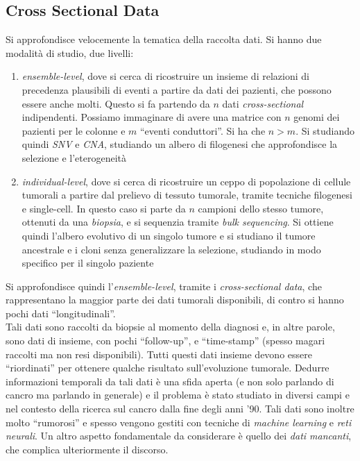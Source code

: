 \documentclass[a4paper,12pt, oneside]{book}
\begin{document}
\subsection{Cross Sectional Data}
Si approfondisce velocemente la tematica della raccolta dati. Si hanno due
modalità di studio, due livelli:
\begin{enumerate}
  \item \textit{ensemble-level}, dove si cerca di ricostruire un insieme di
  relazioni 
  di precedenza plausibili di eventi a partire da dati dei pazienti, che
  possono essere anche molti. Questo si fa partendo da $n$ dati
  \textit{cross-sectional} indipendenti. Possiamo immaginare di avere una
  matrice con $n$ genomi dei pazienti per le colonne e $m$ ``eventi
  conduttori''. Si ha che $n>m$. Si studiando quindi \textit{SNV} e
  \textit{CNA}, studiando un albero di filogenesi che approfondisce la selezione
  e l'eterogeneità
  \item \textit{individual-level}, dove si cerca di ricostruire un ceppo di
  popolazione di cellule tumorali a partire dal prelievo di tessuto tumorale,
  tramite tecniche filogenesi e single-cell. In questo caso si parte da $n$
  campioni dello stesso tumore, ottenuti da una \textit{biopsia}, e si sequenzia
  tramite \textit{bulk sequencing}. Si ottiene quindi l'albero evolutivo di un
  singolo tumore e si studiano il tumore ancestrale e i cloni senza
  generalizzare la selezione, studiando in modo specifico per il singolo
  paziente 
\end{enumerate}
Si approfondisce quindi l'\textit{ensemble-level}, tramite i
\textit{cross-sectional data}, che rappresentano la maggior parte dei dati
tumorali disponibili, di contro si hanno pochi dati ``longitudinali''. \\
Tali dati sono raccolti da biopsie al momento della diagnosi e, in altre parole,
sono dati di insieme, con pochi ``follow-up'', e ``time-stamp'' (spesso magari
raccolti ma non resi disponibili). Tutti questi dati insieme devono essere
``riordinati'' per ottenere qualche risultato sull'evoluzione tumorale. Dedurre
informazioni temporali da tali dati è una sfida aperta (e non solo parlando di
cancro ma parlando in generale) e il problema è stato
studiato in diversi campi e nel contesto della ricerca sul cancro dalla fine
degli anni '90. Tali dati sono inoltre molto ``rumorosi'' e spesso vengono
gestiti con tecniche di \textit{machine learning} e \textit{reti
  neurali}. Un altro aspetto fondamentale da considerare è quello dei
\textit{dati mancanti}, che complica ulteriormente il discorso.\\
\end{document}
